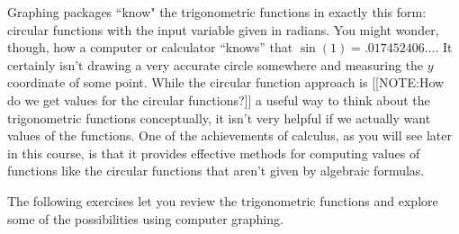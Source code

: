 Graphing packages ``know" the trigonometric functions in exactly this
form: circular functions with the input variable given in radians.
You might wonder, though, how a computer or calculator ``knows'' that
$\sin(1) = .017452406\ldots$.  It certainly isn't drawing a very
accurate circle somewhere and measuring the $y$ coordinate of some
point.  While the circular function approach is 
[[NOTE:How do we get  values for the  circular functions?]]  
a useful way to think about the trigonometric functions conceptually,
it isn't very helpful if we actually want values of the functions.
One of the achievements of calculus, as you will see later in this
course, is that it provides effective methods for computing values of
functions like the circular functions that aren't given by algebraic
formulas.  \

The following exercises let you review the trigonometric functions and
explore some of the possibilities using computer graphing.


